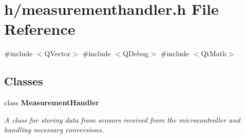 \section{h/measurementhandler.h File Reference}
\label{measurementhandler_8h}
{\ttfamily \#include $<$Q\+Vector$>$}\newline
{\ttfamily \#include $<$Q\+Debug$>$}\newline
{\ttfamily \#include $<$Qt\+Math$>$}\newline
\subsection*{Classes}
\begin{DoxyCompactItemize}
\item 
class \textbf{ Measurement\+Handler}
\begin{DoxyCompactList}\small\item\em A class for storing data from sensors received from the microcontroller and handling necessary conversions. \end{DoxyCompactList}\end{DoxyCompactItemize}
